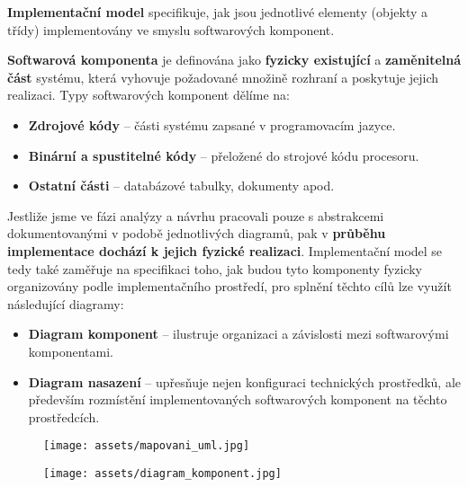 \textbf{Implementační model }specifikuje, jak jsou jednotlivé elementy (objekty a třídy) implementovány ve smyslu softwarových komponent.

\textbf{Softwarová komponenta} je definována jako \textbf{fyzicky existující} a \textbf{zaměnitelná část} systému, která vyhovuje požadované množině rozhraní a poskytuje jejich realizaci. Typy softwarových komponent dělíme na:

\begin{itemize}
\item \textbf{Zdrojové kódy} -- části systému zapsané v programovacím jazyce.
\item \textbf{Binární a spustitelné kódy} -- přeložené do strojové kódu procesoru.
\item \textbf{Ostatní části} -- databázové tabulky, dokumenty apod.
\end{itemize}

Jestliže jsme ve fázi analýzy a návrhu pracovali pouze s abstrakcemi dokumentovanými v podobě jednotlivých {diagramů}, pak v \textbf{průběhu implementace dochází k jejich fyzické realizaci}. Implementační model se tedy také zaměřuje na specifikaci toho, jak budou tyto {komponenty fyzicky organizovány podle implementačního prostředí}, pro splnění těchto cílů lze využít následující diagramy:
\begin{itemize}
\item \textbf{Diagram komponent} -- ilustruje organizaci a závislosti mezi softwarovými komponentami.
\item \textbf{Diagram nasazení} -- upřesňuje nejen konfiguraci technických prostředků, ale především rozmístění implementovaných softwarových komponent na těchto prostředcích.
\end{itemize}

\begin{figure}[H]
  \centering
  \texttt{[image: assets/mapovani\_uml.jpg]}
\end{figure}

\begin{figure}[H]
\centering
\texttt{[image: assets/diagram\_komponent.jpg]}
\end{figure}